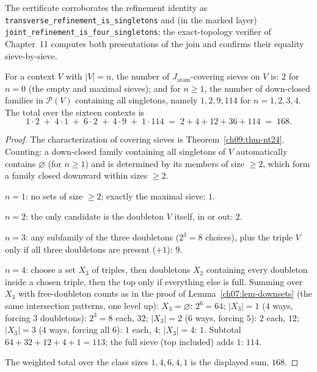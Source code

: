 The certificate corroborates the refinement identity as \texttt{transverse\_refinement\_is\_singletons} and (in the marked layer) \texttt{joint\_refinement\_is\_four\_singletons}; the exact-topology verifier of Chapter~11 computes both presentations of the join and confirms their equality sieve-by-sieve.

\begin{corollary}\label{ch09:cor-census}
For a context $V$ with $|V|=n$, the number of $J_{\mathrm{atom}}$-covering sieves on $V$ is: $2$ for $n=0$ (the empty and maximal sieves); and for $n\ge 1$, the number of down-closed families in $\mathcal{P}(V)$ containing all singletons, namely $1,2,9,114$ for $n=1,2,3,4$. The total over the sixteen contexts is
\[
1\cdot 2\;+\;4\cdot 1\;+\;6\cdot 2\;+\;4\cdot 9\;+\;1\cdot 114\;=\;2+4+12+36+114\;=\;168 .
\]
\end{corollary}

\begin{proof}
The characterization of covering sieves is Theorem~\ref{ch09:thm-nt24}. Counting: a down-closed family containing all singletons of $V$ automatically contains $\varnothing$ (for $n\ge1$) and is determined by its members of size $\ge 2$, which form a family closed downward within sizes $\ge 2$.

$n=1$: no sets of size $\ge 2$; exactly the maximal sieve: $1$.

$n=2$: the only candidate is the doubleton $V$ itself, in or out: $2$.

$n=3$: any subfamily of the three doubletons ($2^{3}=8$ choices), plus the triple $V$ only if all three doubletons are present ($+1$): $9$.

$n=4$: choose a set $X_{3}$ of triples, then doubletons $X_{2}$ containing every doubleton inside a chosen triple, then the top only if everything else is full. Summing over $X_{3}$ with free-doubleton counts as in the proof of Lemma~\ref{ch07:lem-downsets} (the same intersection patterns, one level up): $X_{3}=\varnothing$: $2^{6}=64$; $|X_{3}|=1$ ($4$ ways, forcing $3$ doubletons): $2^{3}=8$ each, $32$; $|X_{3}|=2$ ($6$ ways, forcing $5$): $2$ each, $12$; $|X_{3}|=3$ ($4$ ways, forcing all $6$): $1$ each, $4$; $|X_{3}|=4$: $1$. Subtotal $64+32+12+4+1=113$; the full sieve (top included) adds $1$: $114$.

The weighted total over the class sizes $1,4,6,4,1$ is the displayed sum, $168$.
\end{proof}


